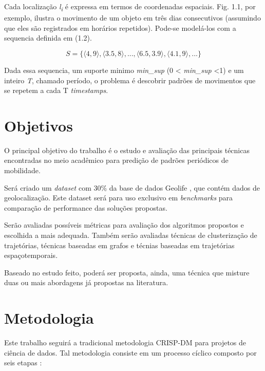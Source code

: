 \documentclass[ppgc,pep]{iiufrgs}
\begin{document}
Cada localização {\it l\textsubscript{i}} é expressa em termos de coordenadas espaciais. 
 Fig. 1.1, por exemplo, ilustra
o movimento de um objeto em três dias consecutivos
(assumindo que eles são registrados em horários repetidos). 
Pode-se modelá-los com a sequencia definida em (1.2). 

\begin{equation}
S = \{ \langle 4, 9 \rangle, \langle 3.5, 8 \rangle, ..., \langle 6.5, 3.9 \rangle, \langle 4.1, 9 \rangle, ... \}
\end{equation}


Dada essa sequencia, um suporte minimo {\it min\_sup} (0 < {\it min\_sup} <1) e um inteiro {\it T}, chamado
período, o problema é descobrir padrões de movimentos que se repetem
a cada T {\it timestamps}. 



\chapter{Objetivos}

O principal objetivo do trabalho é o estudo e avaliação das principais
técnicas encontradas no meio acadêmico para predição de padrões periódicos
de mobilidade.

Será criado um {\it dataset} com 30\% da base de dados Geolife \cite{Zheng:2009:MIL:1526709.1526816},
que contém dados de geolocalização. Este dataset será para uso exclusivo
em {\it benchmarks} para comparação de performance das soluções propostas.

Serão avaliadas possíveis métricas para avaliação dos algoritmos propostos 
e escolhida a mais adequada. Também serão avaliadas técnicas de clusterização 
de trajetórias, técnicas baseadas em grafos e técnias baseadas em trajetórias 
espaçotemporais. 

Baseado no estudo feito, poderá ser proposta, ainda, uma técnica que misture duas ou
mais abordagens já propostas na literatura.



\chapter{Metodologia}

Este trabalho seguirá a tradicional metodologia CRISP-DM para projetos de ciência de dados. Tal metodologia consiste em um processo cíclico composto por seis etapas \cite{Azevedo2008KDDSA}:
\end{document}
